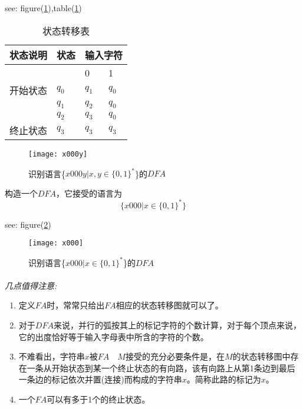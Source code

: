 \begin{example}
	see: figure(\ref{fig:x000y}),table(\ref{tab:x000y})
	\begin{table}
		\caption{状态转移表}
		\label{tab:x000y}       %
		\begin{tabular}{|p{1.3cm}|p{0.7cm}|p{0.7cm}|p{0.7cm}|}
			\hline 
			状态说明 & 状态 & \multicolumn{2}{c|}{输入字符} \\ 
			\hline 
			&  & 0 & 1 \\ 
			\hline 
			开始状态 & $q_0$ & $q_1$ & $q_0$ \\ 
			\hline 
			& $q_1$ & $q_2$ & $q_0$ \\ 
			\hline 
			& $q_2$ & $q_3$ & $q_0$ \\ 
			\hline 
			终止状态 & $q_3$ & $q_3$ & $q_3$ \\ 
			\hline 
		\end{tabular} 
    \end{table}
    \begin{figure}[htbp]
    	\texttt{[image: x000y]}
    	\caption{识别语言\{$x000y|x,y\in\{0,1\}^{\ast}$\}的$DFA$}
    	\label{fig:x000y}       %
    \end{figure}
\end{example}

\begin{example}构造一个$DFA$，它接受的语言为
	\[\{x000|x\in\{0,1\}^{\ast}\}\]
	
	see: figure(\ref{fig:x000})
	\begin{figure}[htbp]
		\texttt{[image: x000]}
		\caption{识别语言\{$x000|x\in\{0,1\}^{\ast}$\}的$DFA$}
		\label{fig:x000}       %
	\end{figure}
\end{example}

\paragraph{}
\begin{note}\emph{几点值得注意:}
	\begin{enumerate}
		\item 定义$FA$时，常常只给出$FA$相应的状态转移图就可以了。 
		\item 对于$DFA$来说，并行的弧按其上的标记字符的个数计算，对于每个顶点来说，它的出度恰好等于输入字母表中所含的字符的个数。 
		\item 不难看出，字符串$x$被$FA\quad M$接受的充分必要条件是，在$M$的状态转移图中存在一条从开始状态到某一个终止状态的有向路，该有向路上从第1条边到最后一条边的标记依次并置(连接)而构成的字符串$x$。简称此路的标记为$x$。 
		\item 一个$FA$可以有多于1个的终止状态。 
	\end{enumerate}
\end{note}

